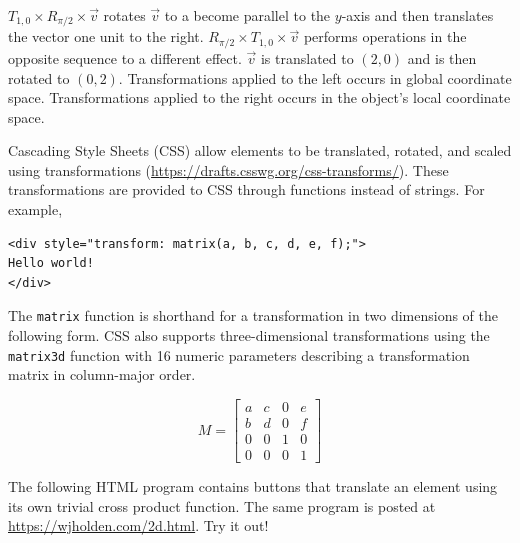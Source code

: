\documentclass{book}
\begin{document}
$T_{1,0} \times R_{\pi/2} \times \vec{v}$ rotates $\vec{v}$ to a become parallel to the $y$-axis and then translates the vector one unit to the right. $R_{\pi/2} \times T_{1,0} \times \vec{v}$ performs operations in the opposite sequence to a different effect. $\vec{v}$ is translated to $(2,0)$ and is then rotated to $(0,2)$. Transformations applied to the left occurs in global coordinate space. Transformations applied to the right occurs in the object's local coordinate space.

Cascading Style Sheets (CSS) allow elements to be translated, rotated, and scaled using transformations (\url{https://drafts.csswg.org/css-transforms/}). These transformations are provided to CSS through functions instead of strings. For example, 

\begin{lstlisting}
<div style="transform: matrix(a, b, c, d, e, f);">
Hello world!
</div>
\end{lstlisting}

The \texttt{matrix} function is shorthand for a transformation in two dimensions of the following form. CSS also supports three-dimensional transformations using the \texttt{matrix3d} function with 16 numeric parameters describing a transformation matrix in column-major order.

\begin{equation*}
M = \begin{bmatrix}a & c & 0 & e\\b & d & 0 & f\\0 & 0 & 1 & 0\\0 & 0 & 0 & 1\end{bmatrix}
\end{equation*}

The following HTML program contains buttons that translate an element using its own trivial cross product function. The same program is posted at \url{https://wjholden.com/2d.html}. Try it out!
\end{document}
